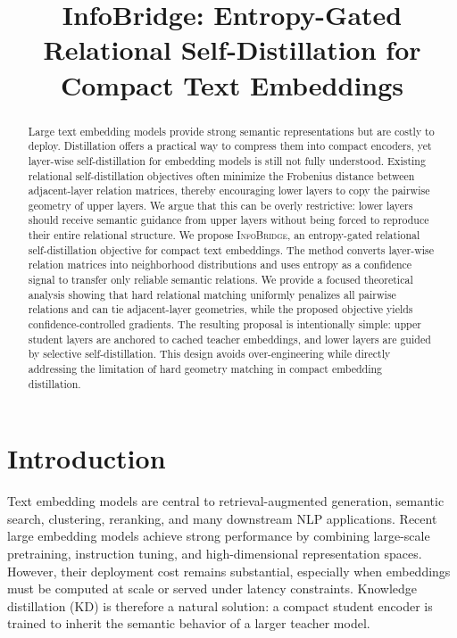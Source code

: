 \documentclass[letterpaper]{article}
\title{InfoBridge: Entropy-Gated Relational Self-Distillation for Compact Text Embeddings}
\begin{document}
\maketitle

\begin{abstract}
Large text embedding models provide strong semantic representations but are costly to deploy. Distillation offers a practical way to compress them into compact encoders, yet layer-wise self-distillation for embedding models is still not fully understood. Existing relational self-distillation objectives often minimize the Frobenius distance between adjacent-layer relation matrices, thereby encouraging lower layers to copy the pairwise geometry of upper layers. We argue that this can be overly restrictive: lower layers should receive semantic guidance from upper layers without being forced to reproduce their entire relational structure. We propose \textsc{InfoBridge}, an entropy-gated relational self-distillation objective for compact text embeddings. The method converts layer-wise relation matrices into neighborhood distributions and uses entropy as a confidence signal to transfer only reliable semantic relations. We provide a focused theoretical analysis showing that hard relational matching uniformly penalizes all pairwise relations and can tie adjacent-layer geometries, while the proposed objective yields confidence-controlled gradients. The resulting proposal is intentionally simple: upper student layers are anchored to cached teacher embeddings, and lower layers are guided by selective self-distillation. This design avoids over-engineering while directly addressing the limitation of hard geometry matching in compact embedding distillation.
\end{abstract}

\section{Introduction}

Text embedding models are central to retrieval-augmented generation, semantic search, clustering, reranking, and many downstream NLP applications. Recent large embedding models achieve strong performance by combining large-scale pretraining, instruction tuning, and high-dimensional representation spaces. However, their deployment cost remains substantial, especially when embeddings must be computed at scale or served under latency constraints. Knowledge distillation (KD) is therefore a natural solution: a compact student encoder is trained to inherit the semantic behavior of a larger teacher model.
\end{document}
